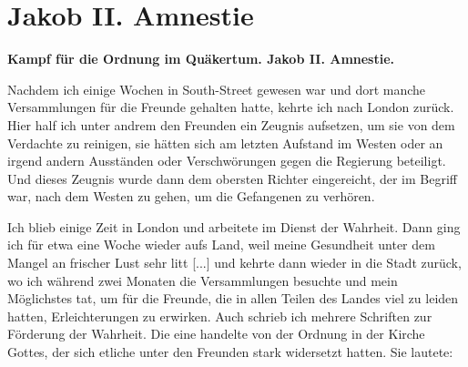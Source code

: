 \chapter[Jakob II. Amnestie]{Jakob II. Amnestie}

\begin{center}
\textbf{Kampf für die Ordnung im Quäkertum. Jakob II. Amnestie.}
\end{center}


Nachdem ich einige Wochen in South-Street gewesen war
und dort manche Versammlungen für die Freunde gehalten hatte,
kehrte ich nach London zurück. Hier half 
ich unter andrem den
Freunden ein Zeugnis aufsetzen, um sie 
von dem Verdachte zu
reinigen, sie hätten sich am letzten Aufstand im Westen oder an
irgend andern Ausständen oder Verschwörungen gegen die Regierung
beteiligt. Und dieses Zeugnis wurde dann dem obersten Richter
eingereicht, der im Begriff war, nach dem Westen zu gehen, um
die Gefangenen zu verhören.

Ich blieb einige Zeit in London und arbeitete im Dienst der
Wahrheit. Dann ging ich für etwa eine Woche wieder aufs
Land, weil meine Gesundheit unter dem Mangel an frischer Lust
sehr litt [...] und kehrte dann wieder in die Stadt zurück, wo
ich während zwei Monaten die Versammlungen besuchte und mein
Möglichstes tat, um für die Freunde, die in allen Teilen des
Landes viel zu leiden hatten, Erleichterungen zu erwirken. Auch
schrieb ich mehrere Schriften zur Förderung der Wahrheit. Die
eine handelte von der Ordnung in der Kirche Gottes, der sich
etliche unter den Freunden stark 
widersetzt hatten. Sie lautete:


